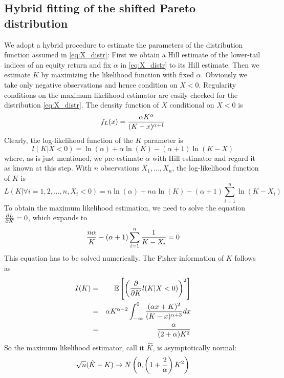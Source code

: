 \documentclass{article}
\begin{document}
\subsection{Hybrid fitting of the shifted Pareto distribution}
\label{sec:hybrid_estimation}
We adopt a hybrid procedure to estimate the parameters of the
distribution function assumed in \eqref{eq:X_distr}: First we
obtain a Hill estimate of the lower-tail indices of an
equity return and fix $\alpha$ in \eqref{eq:X_distr}
to its Hill estimate. Then we estimate $K$ by maximizing
the likelihood function with fixed $\alpha$. Obviously we take only
negative observations and hence condition on $X < 0$. Regularity
conditions on the maximum likelihood estimator are easily checked for
the distribution \eqref{eq:X_distr}.
The density function of $X$ conditional on $X < 0$ is
\[
f_L(x) = {\alpha K^{\alpha} \over (K - x)^{\alpha + 1}}
\]
Clearly, the log-likelihood function of the $K$ parameter is
\[
l(K | X < 0) = \ln(\alpha) + \alpha \ln(K) - (\alpha + 1)\ln(K - X)
\]
where, as is just mentioned, we pre-estimate $\alpha$ with Hill
estimator and regard it as known at this step. With $n$ observations
$X_1, \dots, X_n$, the log-likelihood function of $K$ is
\[
L(K | \forall i=1,2,...,n, X_i < 0) = n \ln(\alpha) + n \alpha \ln(K)
- (\alpha + 1) \sum_{i=1}^n \ln(K - X_i)
\]
To obtain the maximum likelihood estimation, we need to solve the
equation $\frac{\partial L}{\partial K} = 0$, which expands to
\[
{n \alpha \over K} - (\alpha + 1) \sum_{i=1}^n {1 \over K - X_i} = 0
\]
This equation has to be solved numerically.
The Fisher information of $K$ follows as
\begin{eqnarray*}
  I(K) &=& \mathbb{E}\left[ \left( \frac{\partial}{\partial K} l(K | X < 0) \right)^2 \right] \\
  &=& \alpha K^{\alpha - 2}
  \int_{-\infty}^0 {(\alpha x + K)^2 \over (K - x)^{\alpha + 3}} dx \\
  &=& {\alpha \over (2 + \alpha) K^2}
\end{eqnarray*}
So the maximum likelihood estimator, call it $\hat K$, is
asymptotically normal:
\[
\sqrt n (\hat K - K) \to N \left(
  0, \left( 1 + {2 \over \alpha} \right) K^2
\right)
\]
\end{document}
